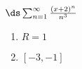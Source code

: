 {$\ds\sum_{n=1}^\infty \frac{(x+2)^n}{n^3}$
}
{\begin{enumerate}
	\item $R=1$
	\item	$[-3,-1]$
\end{enumerate}
}